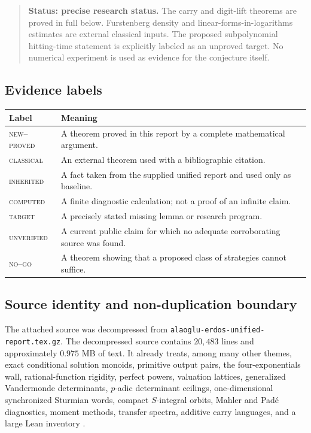 \documentclass[11pt]{article}
\theoremstyle{definition}
\theoremstyle{remark}
\newcommand{\statusproved}{\textcolor{deepgreen}{\textsc{new--proved}}}
\newcommand{\statusclassical}{\textcolor{deepblue}{\textsc{classical}}}
\newcommand{\statuscomputed}{\textcolor{deepblue}{\textsc{computed}}}
\newcommand{\statustarget}{\textcolor{deepred}{\textsc{target}}}
\newcommand{\statusinherited}{\textcolor{deepblue}{\textsc{inherited}}}
\newcommand{\statusunverified}{\textcolor{deepred}{\textsc{unverified}}}
\newcommand{\statusnegative}{\textcolor{deepred}{\textsc{no--go}}}
\newenvironment{statusbox}[1]
{\begin{quote}\small\noindent\textbf{Status: #1.}\quad}
{\end{quote}}
\begin{document}
\begin{statusbox}{precise research status}
The carry and digit-lift theorems are proved in full below.  Furstenberg density and
linear-forms-in-logarithms estimates are external classical inputs.  The proposed
subpolynomial hitting-time statement is explicitly labeled as an unproved target.
No numerical experiment is used as evidence for the conjecture itself.
\end{statusbox}

\subsection{Evidence labels}

\begin{center}
\begin{tabularx}{0.94\textwidth}{>{\raggedright\arraybackslash}p{}X}
\toprule
Label & Meaning \\
\midrule
\statusproved & A theorem proved in this report by a complete mathematical argument.\\
\statusclassical & An external theorem used with a bibliographic citation.\\
\statusinherited & A fact taken from the supplied unified report and used only as baseline.\\
\statuscomputed & A finite diagnostic calculation; not a proof of an infinite claim.\\
\statustarget & A precisely stated missing lemma or research program.\\
\statusunverified & A current public claim for which no adequate corroborating source was found.\\
\statusnegative & A theorem showing that a proposed class of strategies cannot suffice.\\
\bottomrule
\end{tabularx}
\end{center}

\subsection{Source identity and non-duplication boundary}

The attached source was decompressed from
\texttt{alaoglu-erdos-unified-report.tex.gz}.
The decompressed source contains $20{,}483$ lines and approximately $0.975$ MB of
text.  It already treats, among many other themes, exact conditional solution
monoids, primitive output pairs, the four-exponentials wall, rational-function
rigidity, perfect powers, valuation lattices, generalized Vandermonde determinants,
$p$-adic determinant ceilings, one-dimensional synchronized Sturmian words,
compact $S$-integral orbits, Mahler and Pad\'e diagnostics, moment methods, transfer
spectra, additive carry languages, and a large Lean inventory
\cite{UnifiedReport2026}.
\end{document}
